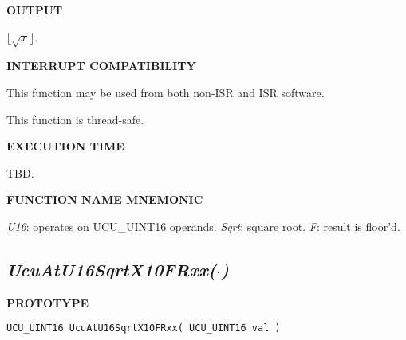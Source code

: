 \noindent\textbf{OUTPUT}
\begin{list}{}{\setlength{\leftmargin}{0.25in}\setlength{\topsep}{0.0in}}
\item $\lfloor \sqrt{x} \rfloor$.
\end{list}
\vspace{2.8ex}

\noindent\textbf{INTERRUPT COMPATIBILITY}
\begin{list}{}{\setlength{\leftmargin}{0.25in}\setlength{\topsep}{0.0in}}
\item This function may be used from both non-ISR and ISR software.
\item This function is thread-safe.
\end{list}
\vspace{2.8ex}

\noindent\textbf{EXECUTION TIME}
\begin{list}{}{\setlength{\leftmargin}{0.25in}\setlength{\topsep}{0.0in}}
\item TBD.
\end{list}
\vspace{2.8ex}

\noindent\textbf{FUNCTION NAME MNEMONIC}
\begin{list}{}{\setlength{\leftmargin}{0.25in}\setlength{\topsep}{0.0in}}
\item \emph{U16}:   operates on UCU\_UINT16 operands.
      \emph{Sqrt}:  square root.
      \emph{F}:     result is floor'd.
\end{list}


\subsection[\emph{UcuAtU16SqrtX10FRxx(\protect\mbox{\protect$\cdot$})}]
           {\emph{UcuAtU16SqrtX10FRxx(\protect\mbox{\protect\boldmath $\cdot$})}}
\label{cafn0:ssre0:suee2}

%

\noindent\textbf{PROTOTYPE}
\begin {list}{}{\setlength{\leftmargin}{0.25in}\setlength{\topsep}{0.0in}}
\item
\begin{verbatim}
UCU_UINT16 UcuAtU16SqrtX10FRxx( UCU_UINT16 val )
\end{verbatim}
\end{list}
\vspace{2.8ex}

